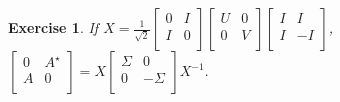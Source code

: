 \documentclass[paper=a4, fontsize=11pt]{scrartcl} %
\numberwithin{equation}{section} %
\numberwithin{figure}{section} %
\numberwithin{table}{section} %
\newtheorem{exercise}{Exercise}
\numberwithin{exercise}{section}
\begin{document}
\begin{exercise}
If $X=\frac{1}{\sqrt{2}} \begin{bmatrix}
0 & I \\
I & 0 \\
\end{bmatrix} 
\begin{bmatrix}
U  & 0 \\
 0 & V \\
\end{bmatrix} \begin{bmatrix}
I   & I \\
I & -I \\
\end{bmatrix}$, $\begin{bmatrix}
0 & A^{\star} \\
A & 0 \\
\end{bmatrix} =X \begin{bmatrix}
\Sigma & 0 \\
0 & -\Sigma \\
\end{bmatrix} X^{-1}.$
\end{exercise}
\end{document}
